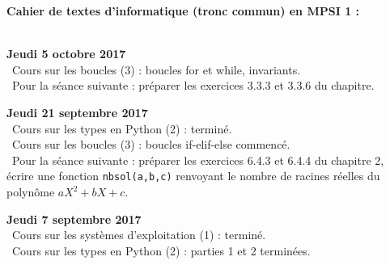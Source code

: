 \documentclass[12pt,a4paper]{article}
\begin{document}
\begin{center}
\Large\bf Cahier de textes d'informatique (tronc commun) en MPSI 1 :
\end{center}
\vspace{1cm}
\vspace{.4cm}\\

\noindent\textbf{Jeudi 5 octobre 2017}\\
\bu\ Cours sur les boucles (3) : boucles for et while, invariants. \\
\bu\ Pour la séance suivante : préparer les exercices 3.3.3 et 3.3.6 du chapitre.\\
\vspace{.4cm}

\noindent\textbf{Jeudi 21 septembre 2017}\\
\bu\ Cours sur les types en Python (2) : terminé. \\
\bu\ Cours sur les boucles (3) : boucles if-elif-else commencé. \\
\bu\ Pour la séance suivante : préparer les exercices 6.4.3 et 6.4.4 du chapitre 2, écrire une fonction \texttt{nbsol(a,b,c)} renvoyant le nombre de racines réelles du polynôme $aX^2+bX+c$.\\
\vspace{.4cm}

\noindent\textbf{Jeudi 7 septembre 2017}\\
\bu\ Cours sur les systèmes d'exploitation (1) : terminé.  \\
\bu\ Cours sur les types en Python (2) : parties 1 et 2 terminées. \\
\vspace{.4cm}

\label{end}
\end{document}
